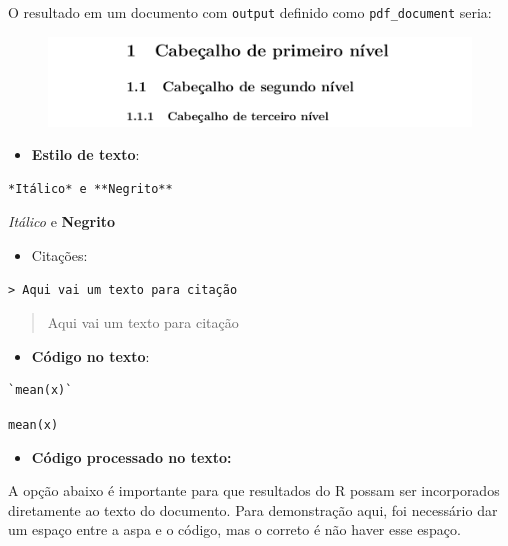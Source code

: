 \documentclass[]{book}
\providecommand{\tightlist}{%
  \setlength{\itemsep}{0pt}\setlength{\parskip}{0pt}}
\begin{document}
O resultado em um documento com \texttt{output} definido como
\texttt{pdf\_document} seria:

\begin{figure}
\centering
\includegraphics{images/headers.png}
\caption{}
\end{figure}

\begin{itemize}
\tightlist
\item
  \textbf{Estilo de texto}:
\end{itemize}

\begin{verbatim}
*Itálico* e **Negrito**
\end{verbatim}

\emph{Itálico} e \textbf{Negrito}

\begin{itemize}
\tightlist
\item
  Citações:
\end{itemize}

\begin{verbatim}
> Aqui vai um texto para citação
\end{verbatim}

\begin{quote}
Aqui vai um texto para citação
\end{quote}

\begin{itemize}
\tightlist
\item
  \textbf{Código no texto}:
\end{itemize}

\begin{verbatim}
`mean(x)`
\end{verbatim}

\texttt{mean(x)}

\begin{itemize}
\tightlist
\item
  \textbf{Código processado no texto:}
\end{itemize}

A opção abaixo é importante para que resultados do R possam ser
incorporados diretamente ao texto do documento. Para demonstração aqui,
foi necessário dar um espaço entre a aspa e o código, mas o correto é
não haver esse espaço.
\end{document}
